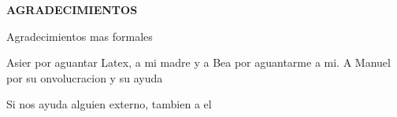 \begin{center}
{\Large \bfseries AGRADECIMIENTOS}
\vspace{2.5cm}
\end{center}


Agradecimientos mas formales

Asier por aguantar Latex, a mi madre y a Bea por aguantarme a mi.
A Manuel por su onvolucracion y su ayuda

Si nos ayuda alguien externo, tambien a el
